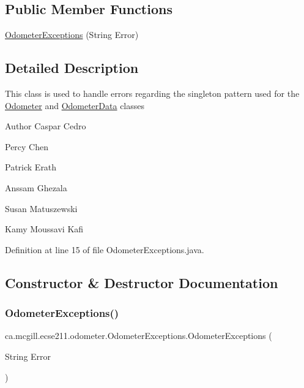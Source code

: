 \subsection*{Public Member Functions}
\begin{DoxyCompactItemize}
\item 
\hyperlink{classca_1_1mcgill_1_1ecse211_1_1odometer_1_1_odometer_exceptions_a25aa31baebe4906716a920929f0284d2}{Odometer\+Exceptions} (String Error)
\end{DoxyCompactItemize}


\subsection{Detailed Description}
This class is used to handle errors regarding the singleton pattern used for the \hyperlink{classca_1_1mcgill_1_1ecse211_1_1odometer_1_1_odometer}{Odometer} and \hyperlink{classca_1_1mcgill_1_1ecse211_1_1odometer_1_1_odometer_data}{Odometer\+Data} classes

\begin{DoxyAuthor}{Author}
Caspar Cedro 

Percy Chen 

Patrick Erath 

Anssam Ghezala 

Susan Matuszewski 

Kamy Moussavi Kafi 
\end{DoxyAuthor}


Definition at line 15 of file Odometer\+Exceptions.\+java.



\subsection{Constructor \& Destructor Documentation}
\mbox{\label{classca_1_1mcgill_1_1ecse211_1_1odometer_1_1_odometer_exceptions_a25aa31baebe4906716a920929f0284d2}} 
\subsubsection{\texorpdfstring{Odometer\+Exceptions()}{OdometerExceptions()}}
{\footnotesize\ttfamily ca.\+mcgill.\+ecse211.\+odometer.\+Odometer\+Exceptions.\+Odometer\+Exceptions (\begin{DoxyParamCaption}\item[{String}]{Error }\end{DoxyParamCaption})}

